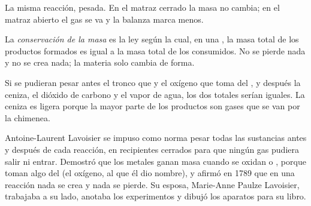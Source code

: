 \begin{omfigure}

{\small La misma reacción, pesada. En el matraz cerrado la masa no
cambia; en el matraz abierto el gas se va y la balanza marca menos.}
\end{omfigure}

\begin{definition}\label{def:g8:balanced-equations:conservation}
La \emph{conservación de la masa} es la
ley según la cual, en una , la masa total de los
productos formados es igual a la masa total de los 
consumidos. No se pierde nada y no se crea nada; la materia solo cambia
de forma.
\end{definition}

\begin{example}\label{ex:g8:balanced-equations:log}
Si se pudieran pesar antes el tronco que  y el oxígeno que toma del
, y después la ceniza, el dióxido de carbono y el vapor de agua, los
dos totales serían iguales. La ceniza es ligera porque la mayor parte de
los productos son gases que se van por la chimenea.
\end{example}

\begin{history}
Antoine-Laurent Lavoisier se impuso como norma pesar
todas las sustancias antes y después de cada reacción, en recipientes
cerrados para que ningún gas pudiera salir ni entrar. Demostró que los
metales ganan masa cuando se oxidan o , porque toman algo del 
(el oxígeno, al que él dio nombre), y afirmó en 1789 que en una
reacción nada se crea y nada se pierde. Su esposa, Marie-Anne Paulze
Lavoisier, trabajaba a su lado, anotaba los experimentos y dibujó los
aparatos para su libro.
\end{history}


